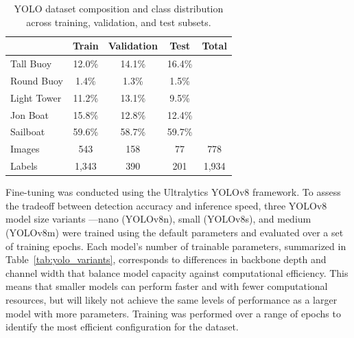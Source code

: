 \documentclass{erauthesis}
\begin{document}
\begin{table}[htbp]
\centering
\begin{tabular}{lcccc}
\hline
& Train & Validation & Test & Total \\
\hline

Tall Buoy & 12.0\% & 14.1\% & 16.4\% &  \\
Round Buoy & 1.4\% & 1.3\% & 1.5\% &  \\
Light Tower & 11.2\% & 13.1\% & 9.5\% &  \\
Jon Boat & 15.8\% & 12.8\% & 12.4\% &  \\
Sailboat & 59.6\% & 58.7\% & 59.7\% &  \\
\hline
Images & 543 & 158 & 77 & 778 \\
Labels & 1,343 & 390 & 201 & 1,934 \\
\hline
\end{tabular}
\caption{YOLO dataset composition and class distribution across training, validation, and test subsets.}
\label{table:yolo_data_split}
\end{table}


Fine-tuning was conducted using the Ultralytics YOLOv8 framework. \cite{ultralytics} %
To assess the tradeoff between detection accuracy and inference speed, three YOLOv8 model size variants —nano (YOLOv8n), small (YOLOv8s), and medium (YOLOv8m) were trained using the default parameters and evaluated over a set of training epochs.
Each model’s number of trainable parameters, summarized in Table~\ref{tab:yolo_variants}, corresponds to differences in backbone depth and channel width that balance model capacity against computational efficiency.
This means that smaller models can perform faster and with fewer computational resources, but will likely not achieve the same levels of performance as a larger model with more parameters.
Training was performed over a range of epochs to identify the most efficient configuration for the dataset.
\end{document}
